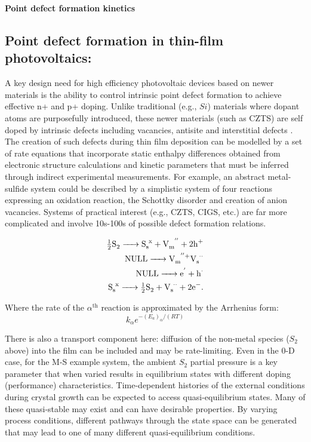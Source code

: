 \documentclass[11pt]{article}
\begin{document}
\begin{center}
{\Large{\textbf{Point defect formation kinetics}}}
\end{center}

 
\subsection*{Point defect formation in thin-film photovoltaics:}
A key design need for high efficiency photovoltaic devices based on
newer materials is the ability to control intrinsic point defect
formation to achieve effective n+ and p+ doping. Unlike traditional
(e.g., $Si$) materials where dopant atoms are purposefully introduced,
these newer materials (such as CZTS) are self doped by intrinsic
defects including vacancies, antisite and interstitial defects
\cite{JiangY13}. The creation of such defects during thin film
deposition can be modelled by a set of rate equations that incorporate
static enthalpy differences obtained from electronic structure
calculations and kinetic parameters that must be inferred through
indirect experimental measurements. For example, an abstract
metal-sulfide system could be described by a simplistic system of four
reactions expressing an oxidation reaction, the Schottky disorder and
creation of anion vacancies. Systems of practical interest (e.g.,
CZTS, CIGS, etc.) are far more complicated and involve 10s-100s of
possible defect formation relations.

\begin{eqnarray*}
\ce{ \tfrac{1}{2} S2 -> S_s^x + V_m^{''} + 2 h^+ } \\
\ce{ NULL -> V_m^{''}+ V_s^{$\cdot \cdot$} } \\
\ce{ NULL -> e^' + h^{$\cdot$} } \\
\ce{ S_s^x -> \tfrac{1}{2} S2 + V_s^{$\cdot \cdot$} + 2 e^- }.
\end{eqnarray*}

Where the rate of the $\alpha^{\mathrm{th}}$ reaction is approximated
by the Arrhenius form:
\begin{equation}
  \label{eq:1}
  k_\alpha e^{-(E_a)_\alpha/(RT)}
\end{equation}

There is also a transport component here: diffusion of the non-metal
species ($S_2$ above) into the film can be included and may be
rate-limiting. Even in the 0-D case, for the M-S example system, the
ambient $S_2$ partial pressure is a key parameter that when varied
results in equilibrium states with different doping (performance)
characteristics.  Time-dependent histories of the external conditions
during crystal growth can be expected to access quasi-equilibrium
states. Many of these quasi-stable may exist and can have desirable
properties. By varying process conditions, different pathways through
the state space can be generated that may lead to one of many
different quasi-equilibrium conditions.
\end{document}
